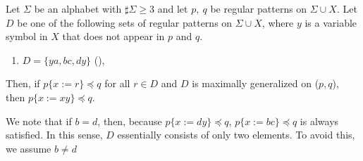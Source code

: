 \begin{lem}\label{lem:oneside_i}
Let $\Sigma$ be an alphabet with $\sharp\Sigma \ge 3$ and let $p,~q$ be regular patterns on $\Sigma\cup X$.
Let $D$ be one of the following sets of regular patterns on $\Sigma\cup X$, where $y$ is a variable symbol in $X$ that does not appear in $p$ and $q$.
\begin{enumerate}
\item[] $D=\{ ya, bc, dy \}$ (\TheConditionB),
\end{enumerate}
Then, if $p \{ x := r \} \preceq q$ for all $r \in D$ and $D$ is maximally generalized on ($p,q$), then $p \{ x := xy \} \preceq q$.
\end{lem}

We note that if $b = d$, then, because $p\{x:=dy\}\preceq q$, $p\{x:=bc\}\preceq q$ is always satisfied.
In this sense, $D$ essentially consists of only two elements.
To avoid this, we assume $b \not= d$

\smallskip


